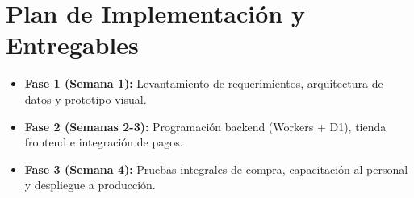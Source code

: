 \documentclass[11pt,a4paper]{article}
\begin{document}
\section{Plan de Implementación y Entregables}
\begin{itemize}[leftmargin=1.5em]
    \item \textbf{Fase 1 (Semana 1):} Levantamiento de requerimientos, arquitectura de datos y prototipo visual.
    \item \textbf{Fase 2 (Semanas 2-3):} Programación backend (Workers + D1), tienda frontend e integración de pagos.
    \item \textbf{Fase 3 (Semana 4):} Pruebas integrales de compra, capacitación al personal y despliegue a producción.
\end{itemize}
\end{document}

